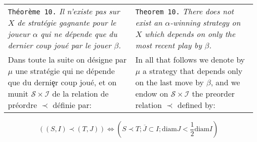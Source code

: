 \documentclass[12pt]{article}
\theoremstyle{plain}
\theoremstyle{definition}
\theoremstyle{remark}
\begin{document}
\begin{tabular}{p{2.8in} p{2.8in}}
\texttt{Th\'eor\`eme 10.} \textit{Il n'existe pas sur $X$ de strat\'egie gagnante pour le joueur $\alpha$ qui ne d\'epende que du dernier coup jou\'e par le jouer $\beta$.}

&

\texttt{Theorem 10.} \textit{There does not exist an $\alpha$-winning strategy on $X$ which depends on only the most recent play by $\beta$.}

\\

Dans toute la suite on d\'esigne par $\mu$ une strat\'egie qui ne d\'epende que du derni\c{e}r coup jou\'e, et on munit $\mathcal{S}\times\mathcal{I}$ de la relation de pr\'eordre $\prec$ d\'efinie par:

&

In all that follows we denote by $\mu$ a strategy that depends only on the last move by $\beta$, and we endow on $\mathcal{S}\times\mathcal{I}$ the preorder relation $\prec$ defined by:

\end{tabular}

\[((S,I)\prec(T,J))\Leftrightarrow (S\prec T; \overline{J}\subset I; \textrm{diam}J < \frac{1}{2}\textrm{diam}I)\]
\end{document}
